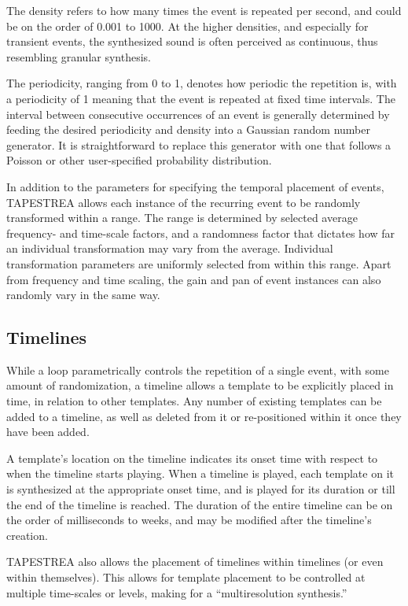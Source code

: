 \documentclass[10pt,letterpaper]{article}
\begin{document}
The density refers to how many times the event is repeated per second,
and could be on the order of 0.001 to 1000. At the higher densities, and
especially for transient events, the synthesized sound is often
perceived as continuous, thus resembling granular synthesis. 

The periodicity, ranging from 0 to 1, denotes how periodic the
repetition is, with a periodicity of 1 meaning that the event is
repeated at fixed time intervals. The interval between consecutive
occurrences of an event is generally determined by feeding the desired
periodicity and density into a Gaussian random number generator. It is
straightforward to replace this generator with one that follows a
Poisson or other user-specified probability distribution. 

In addition to the parameters for specifying the temporal placement of
events, TAPESTREA allows each instance of the recurring event to be
randomly transformed within a range. The range is determined by selected
average frequency- and time-scale factors, and a randomness factor that
dictates how far an individual transformation may vary from the average.
Individual transformation parameters are uniformly selected from within
this range. Apart from frequency and time scaling, the gain and pan of
event instances can also randomly vary in the same way.

\subsection{Timelines}

While a loop parametrically controls the repetition of a single event,
with some amount of randomization, a timeline allows a template to be
explicitly placed in time, in relation to other templates. Any number of
existing templates can be added to a timeline, as well as deleted from
it or re-positioned within it once they have been added. 

A template's location on the timeline indicates its onset time with
respect to when the timeline starts playing. When a timeline is played,
each template on it is synthesized at the appropriate onset time, and is
played for its duration or till the end of the timeline is reached. The
duration of the entire timeline can be on the order of milliseconds to
weeks, and may be modified after the timeline's creation. 

TAPESTREA also allows the placement of timelines within timelines (or
even within themselves). This allows for template placement to be
controlled at multiple time-scales or levels, making for a
``multiresolution synthesis.''
\end{document}
